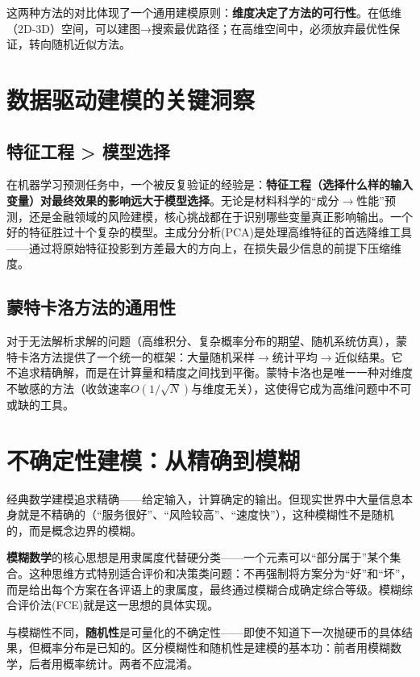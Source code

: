 \documentclass[12pt,a4paper]{ctexart}
\begin{document}
这两种方法的对比体现了一个通用建模原则：\textbf{维度决定了方法的可行性}。在低维（2D-3D）空间，可以建图→搜索最优路径；在高维空间中，必须放弃最优性保证，转向随机近似方法。

\section{数据驱动建模的关键洞察}

\subsection{特征工程 > 模型选择}

在机器学习预测任务中，一个被反复验证的经验是：\textbf{特征工程（选择什么样的输入变量）对最终效果的影响远大于模型选择}。无论是材料科学的``成分$\to$性能''预测，还是金融领域的风险建模，核心挑战都在于识别哪些变量真正影响输出。一个好的特征胜过十个复杂的模型。主成分分析(PCA)是处理高维特征的首选降维工具——通过将原始特征投影到方差最大的方向上，在损失最少信息的前提下压缩维度。

\subsection{蒙特卡洛方法的通用性}

对于无法解析求解的问题（高维积分、复杂概率分布的期望、随机系统仿真），蒙特卡洛方法提供了一个统一的框架：大量随机采样$\to$统计平均$\to$近似结果。它不追求精确解，而是在计算量和精度之间找到平衡。蒙特卡洛也是唯一一种对维度不敏感的方法（收敛速率$O(1/\sqrt{N})$与维度无关），这使得它成为高维问题中不可或缺的工具。

\section{不确定性建模：从精确到模糊}

经典数学建模追求精确——给定输入，计算确定的输出。但现实世界中大量信息本身就是不精确的（``服务很好''、``风险较高''、``速度快''），这种模糊性不是随机的，而是概念边界的模糊。

\textbf{模糊数学}的核心思想是用隶属度代替硬分类——一个元素可以``部分属于''某个集合。这种思维方式特别适合评价和决策类问题：不再强制将方案分为``好''和``坏''，而是给出每个方案在各评语上的隶属度，最终通过模糊合成确定综合等级。模糊综合评价法(FCE)就是这一思想的具体实现。

与模糊性不同，\textbf{随机性}是可量化的不确定性——即使不知道下一次抛硬币的具体结果，但概率分布是已知的。区分模糊性和随机性是建模的基本功：前者用模糊数学，后者用概率统计。两者不应混淆。
\end{document}
